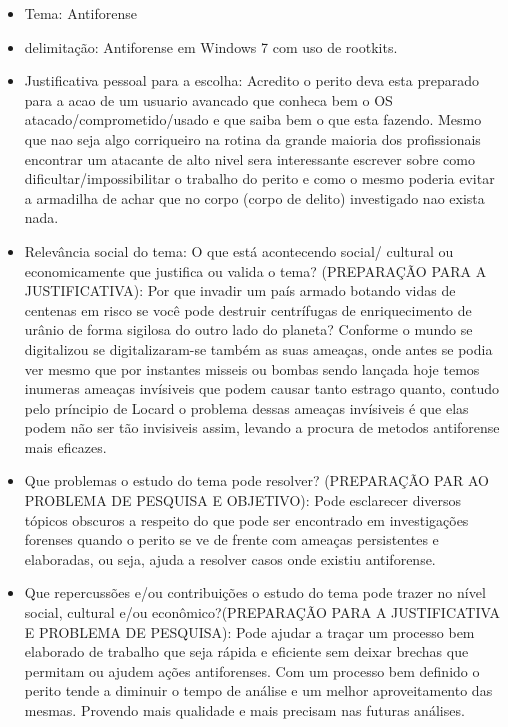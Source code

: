 \begin{itemize}
	\item Tema: Antiforense

	\item delimitação: Antiforense em Windows 7 com uso de rootkits.

	\item Justificativa pessoal para a escolha: Acredito o perito deva esta preparado para a acao de um usuario avancado que conheca bem o OS atacado/comprometido/usado e que saiba bem o que esta fazendo. Mesmo que nao seja algo corriqueiro na rotina da grande maioria dos profissionais encontrar um atacante de alto nivel sera interessante escrever sobre como dificultar/impossibilitar o trabalho do perito e como o mesmo poderia evitar a armadilha de achar que no corpo (corpo de delito) investigado nao exista nada.

	\item Relevância social  do tema: O que está acontecendo social/ cultural ou economicamente que justifica ou valida o tema? (PREPARAÇÃO PARA A JUSTIFICATIVA): Por que invadir um país armado botando vidas de centenas em risco se você pode destruir centrífugas de enriquecimento de urânio de forma sigilosa do outro lado do planeta? Conforme o mundo se digitalizou se digitalizaram-se também as suas ameaças, onde antes se podia ver mesmo que por instantes misseis ou bombas sendo lançada hoje temos inumeras ameaças invísiveis que podem causar tanto estrago quanto, contudo pelo príncipio de Locard o problema dessas ameaças invísiveis é que elas podem não ser tão invisiveis assim, levando a procura de metodos antiforense mais eficazes.

	\item Que problemas o estudo do tema pode resolver? (PREPARAÇÃO PAR AO PROBLEMA DE PESQUISA E OBJETIVO): Pode esclarecer diversos tópicos obscuros a respeito do que pode ser encontrado em investigações forenses quando o perito se ve de frente com ameaças persistentes e elaboradas, ou seja, ajuda a resolver casos onde existiu antiforense.

	\item Que repercussões e/ou contribuições o estudo do tema pode trazer no nível social, cultural e/ou econômico?(PREPARAÇÃO PARA A JUSTIFICATIVA E PROBLEMA DE PESQUISA): Pode ajudar a traçar um processo bem elaborado de trabalho que seja rápida e eficiente sem deixar brechas que permitam ou ajudem ações antiforenses. Com um processo bem definido o perito tende a diminuir o tempo de análise e um melhor aproveitamento das mesmas. Provendo mais qualidade e mais precisam nas futuras análises.


\end{itemize}
